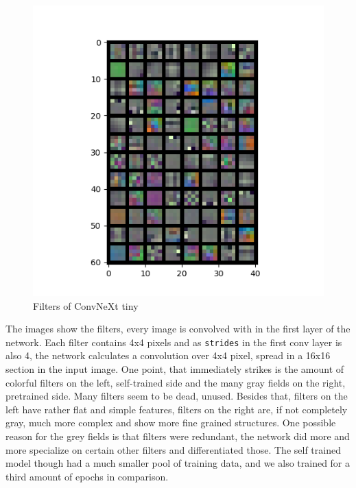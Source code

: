 \documentclass{article}
\begin{document}
\begin{figure}[!tbp]
\begin{minipage}[b]{0.49\textwidth}
        \includegraphics[width=\textwidth]{images/filters_layer0_pretrained.png}
        \caption{Filters of ConvNeXt tiny}
    \end{minipage}
\end{figure}
The images show the filters, every image is convolved with in the first layer of the network.
Each filter contains 4x4 pixels and as \texttt{strides} in the first conv layer is also 4, the network calculates a convolution over 4x4 pixel, spread in a 16x16 section in the input image.
One point, that immediately strikes is the amount of colorful filters on the left, self-trained side and the many gray fields on the right, pretrained side.
Many filters seem to be dead, unused.
Besides that, filters on the left have rather flat and simple features, filters on the right are, if not completely gray, much more complex and show more fine grained structures.
One possible reason for the grey fields is that filters were redundant, the network did more and more specialize on certain other filters and differentiated those.
The self trained model though had a much smaller pool of training data, and we also trained for a third amount of epochs in comparison.
\end{document}
